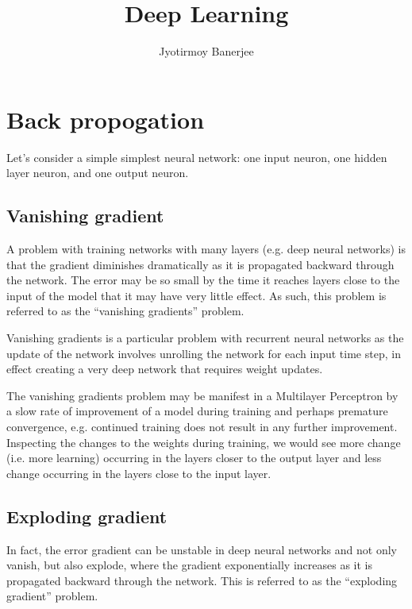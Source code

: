 \documentclass{article}
\title{Deep Learning}
\author{Jyotirmoy Banerjee}
\begin{document}
\maketitle


\section{Back propogation}

Let's consider a simple simplest neural network: one input neuron, one hidden layer neuron, and one output neuron.



\subsection{Vanishing gradient}

A problem with training networks with many layers (e.g. deep neural networks) is that the gradient diminishes dramatically as it is propagated backward through the network. The error may be so small by the time it reaches layers close to the input of the model that it may have very little effect. As such, this problem is referred to as the ``vanishing gradients'' problem.

Vanishing gradients is a particular problem with recurrent neural networks as the update of the network involves unrolling the network for each input time step, in effect creating a very deep network that requires weight updates.

The vanishing gradients problem may be manifest in a Multilayer Perceptron by a slow rate of improvement of a model during training and perhaps premature convergence, e.g. continued training does not result in any further improvement. Inspecting the changes to the weights during training, we would see more change (i.e. more learning) occurring in the layers closer to the output layer and less change occurring in the layers close to the input layer.

\subsection{Exploding gradient}

In fact, the error gradient can be unstable in deep neural networks and not only vanish, but also explode, where the gradient exponentially increases as it is propagated backward through the network. This is referred to as the ``exploding gradient'' problem.
\end{document}
